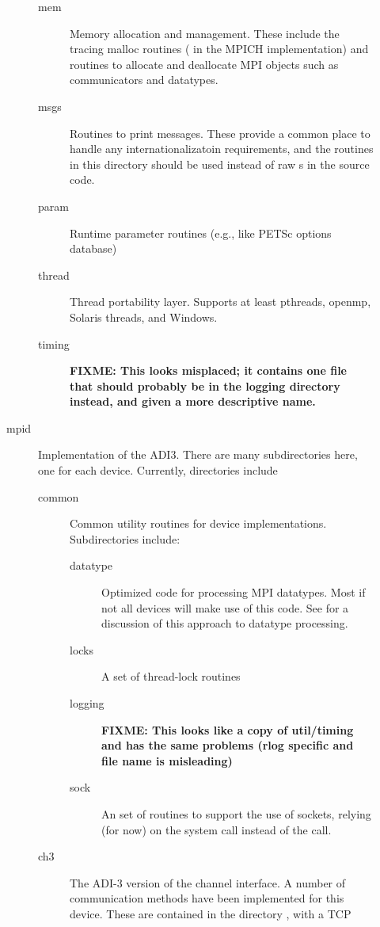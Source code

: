 \documentclass{article}
\def\fixme#1{\marginpar{FIXME:}\textbf{FIXME: #1}}
\begin{document}
\begin{description}
\begin{description}
\begin{description}
\begin{description}
    \end{description}
    \item[mem]Memory allocation and management.  These include the tracing
      malloc routines ( in the MPICH implementation) and
    routines to allocate and deallocate MPI objects such as
    communicators and datatypes.
    \item[msgs]Routines to print messages.  These provide a common
    place to handle any internationalizatoin requirements, and the
    routines in this directory should be used instead of raw
    s in the source code.
    \item[param]Runtime parameter routines (e.g., like PETSc options database)
    \item[thread]Thread portability layer.  Supports at least pthreads,
      openmp, Solaris threads, and Windows.
    \item[timing]\fixme{This looks misplaced; it contains one file that
      should probably be in the logging directory instead, and given a
      more descriptive name.}
    \end{description}
  \item[mpid]Implementation of the ADI3.  There are many
    subdirectories here, one for each device.  Currently, directories include
    \begin{description}
    \item[common]Common utility routines for device implementations.
    Subdirectories include:
    \begin{description}
      \item[datatype]Optimized code for processing MPI datatypes.
      Most if not all devices will make use of this code.  See
      \cite{ross-datatype} for a discussion of this approach to
      datatype processing.
      \item[locks]A set of thread-lock routines
      \item[logging]\fixme{This looks like a copy of util/timing and
      has the same problems (rlog specific and file name is misleading)}
      \item[sock]An set of routines to support the use of sockets,
      relying (for now) on the  system call instead of the
       call.
    \end{description}
    \item[ch3]The ADI-3 version of the channel interface.  A number of
      communication methods have been implemented for this device.
      These are contained in the directory , with a TCP

\end{description}
\end{description}
\end{description}
\end{document}
